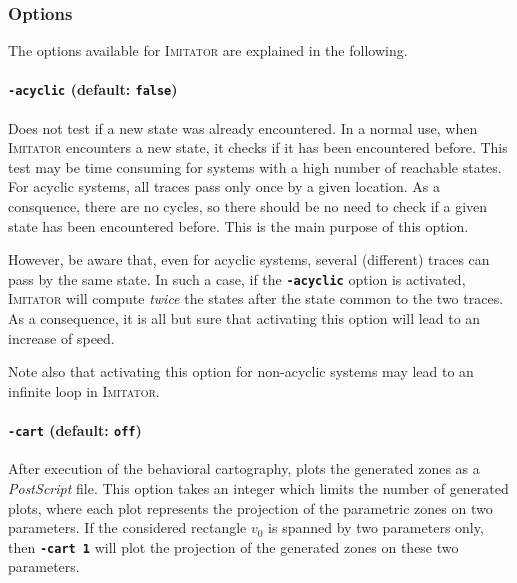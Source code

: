 \documentclass[a4paper,10pt]{article}
\newcommand{\imitator}{\textsc{Imitator}}
\newcommand{\code}[1]{\textbf{\texttt{#1}}}
\begin{document}
\subsubsection{Options} \label{sss:options}

The options available for \imitator{} are explained in the following.

\paragraph{\code{-acyclic} (default: \code{false})}
Does not test if a new state was already encountered.
In a normal use, when \imitator{} encounters a new state, it checks if it has been encountered before.
This test may be time consuming for systems with a high number of reachable states.
For acyclic systems, all traces pass only once by a given location.
As a consquence, there are no cycles, so there should be no need to check if a given state has been encountered before.
This is the main purpose of this option.

However, be aware that, even for acyclic systems, several (different) traces can pass by the same state.
In such a case, if the \code{-acyclic} option is activated, \imitator{} will compute \emph{twice} the states after the state common to the two traces.
As a consequence, it is all but sure that activating this option will lead to an increase of speed.

Note also that activating this option for non-acyclic systems may lead to an infinite loop in \imitator{}.

\paragraph{\code{-cart} (default: \code{off})}

After execution of the behavioral cartography, plots the generated
zones as a \emph{PostScript} file. This option takes an integer which
limits the number of generated plots, where each plot represents the
projection of the parametric zones on two parameters. If the
considered rectangle $v_0$ is spanned by two parameters only, then
\code{-cart 1} will plot the projection of the generated zones on
these two parameters. 
\end{document}
